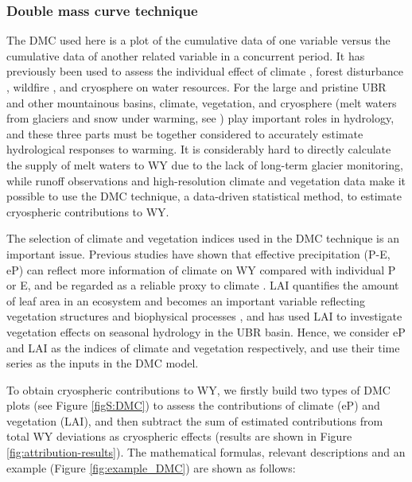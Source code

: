 \documentclass[hess, manuscript]{copernicus}
\begin{document}
\subsubsection{Double mass curve technique}
The DMC used here is a plot of the cumulative data of one variable versus the cumulative data of another related variable in a concurrent period. It has previously been used to assess the individual effect of climate \citep{gao2011changes}, forest disturbance \citep{wei2010quantifying}, wildfire \citep{hallema2018burned}, and cryosphere \citep{brahney2017determining} on water resources. For the large and pristine UBR and other mountainous basins, climate, vegetation, and cryosphere (melt waters from glaciers and snow under warming, see \citealt{biemans2019importance,huss2018global}) play important roles in hydrology, and these three parts must be together considered to accurately estimate hydrological responses to warming. It is considerably hard to directly calculate the supply of melt waters to WY due to the lack of long-term glacier monitoring, while runoff observations and high-resolution climate and vegetation data make it possible to use the DMC technique, a data-driven statistical method, to estimate cryospheric contributions to WY.  

The selection of climate and vegetation indices used in the DMC technique is an important issue. Previous studies have shown that effective precipitation (P-E, eP) can reflect more information of climate on WY compared with individual P or E, and be regarded as a reliable proxy to climate \citep{wei2010quantifying,zhang2019separating}. LAI quantifies the amount of leaf area in an ecosystem and becomes an important variable reflecting vegetation structures and biophysical processes \citep{forzieri2020increased}, and \citet{li2021vegetation} has used LAI to investigate vegetation effects on seasonal hydrology in the UBR basin. Hence, we consider eP and LAI as the indices of climate and vegetation respectively, and use their time series as the inputs in the DMC model. 

To obtain cryospheric contributions to WY, we firstly build two types of DMC plots (see Figure \ref{figS:DMC}) to assess the contributions of climate (eP) and vegetation (LAI), and then subtract the sum of estimated contributions from total WY deviations as cryospheric effects (results are shown in Figure \ref{fig:attribution-results}). The mathematical formulas, relevant descriptions and an example (Figure \ref{fig:example_DMC}) are shown as follows:
\end{document}
